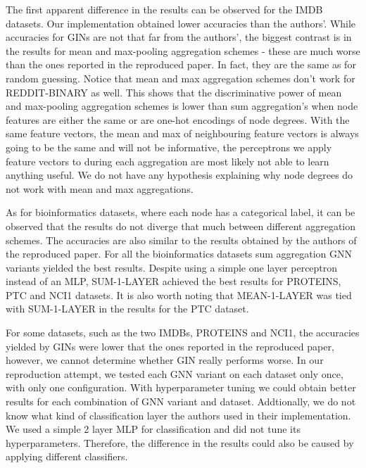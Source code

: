 \documentclass{article} %
\begin{document}
The first apparent difference in the results can be observed for the IMDB datasets. Our implementation obtained lower accuracies than the authors'. While accuracies for GINs are not that far from the authors', the biggest contrast is in the results for mean and max-pooling aggregation schemes - these are much worse than the ones reported in the reproduced paper. In fact, they are the same as for random guessing. Notice that mean and max aggregation schemes don't work for REDDIT-BINARY as well. This shows that the discriminative power of mean and max-pooling aggregation schemes is lower than sum aggregation's when node features are either the same or are one-hot encodings of node degrees. With the same feature vectors, the mean and max of neighbouring feature vectors is always going to be the same and will not be informative, the perceptrons we apply feature vectors to during each aggregation are most likely not able to learn anything useful. We do not have any hypothesis explaining why node degrees do not work with mean and max aggregations.

As for bioinformatics datasets, where each node has a categorical label, it can be observed that the results do not diverge that much between different aggregation schemes. The accuracies are also similar to the results obtained by the authors of the reproduced paper. For all the bioinformatics datasets sum aggregation GNN variants yielded the best results. Despite using a simple one layer perceptron instead of an MLP, SUM-1-LAYER achieved the best results for PROTEINS, PTC and NCI1 datasets. It is also worth noting that MEAN-1-LAYER was tied with SUM-1-LAYER in the results for the PTC dataset.

For some datasets, such as the two IMDBs, PROTEINS and NCI1, the accuracies yielded by GINs were lower that the ones reported in the reproduced paper, however, we cannot determine whether GIN really performs worse. In our reproduction attempt, we tested each GNN variant on each dataset only once, with only one configuration. With hyperparameter tuning we could obtain better results for each combination of GNN variant and dataset. Addtionally, we do not know what kind of classification layer the authors used in their implementation. We used a simple 2 layer MLP for classification and did not tune its hyperparameters. Therefore, the difference in the results could also be caused by applying different classifiers.
\end{document}
